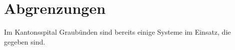 
\chapter{Abgrenzungen}
Im Kantonsspital Graubünden sind bereits einige Systeme im Einsatz, die gegeben sind.
